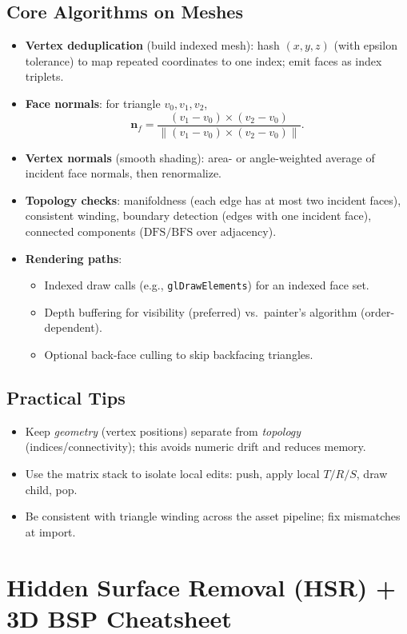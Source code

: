 \documentclass[10pt,twocolumn]{extarticle}
\begin{document}
\subsection*{Core Algorithms on Meshes}
\begin{itemize}
  \item \textbf{Vertex deduplication} (build indexed mesh): hash \((x,y,z)\) (with epsilon tolerance) to map repeated coordinates to one index; emit faces as index triplets.
  \item \textbf{Face normals}: for triangle \(v_0,v_1,v_2\),
  \[
    \mathbf n_f = \frac{(v_1 - v_0) \times (v_2 - v_0)}{\|(v_1 - v_0) \times (v_2 - v_0)\|}.
  \]
  \item \textbf{Vertex normals} (smooth shading): area- or angle-weighted average of incident face normals, then renormalize.
  \item \textbf{Topology checks}: manifoldness (each edge has at most two incident faces), consistent winding, boundary detection (edges with one incident face), connected components (\( \mathrm{DFS}/\mathrm{BFS} \) over adjacency).
  \item \textbf{Rendering paths}:
    \begin{itemize}
      \item Indexed draw calls (e.g., \verb|glDrawElements|) for an indexed face set.
      \item Depth buffering for visibility (preferred) vs.\ painter’s algorithm (order-dependent).
      \item Optional back-face culling to skip backfacing triangles.
    \end{itemize}
\end{itemize}

\subsection*{Practical Tips}
\begin{itemize}
  \item Keep \emph{geometry} (vertex positions) separate from \emph{topology} (indices/connectivity); this avoids numeric drift and reduces memory.
  \item Use the matrix stack to isolate local edits: push, apply local \(T/R/S\), draw child, pop.
  \item Be consistent with triangle winding across the asset pipeline; fix mismatches at import.
\end{itemize}


\section*{Hidden Surface Removal (HSR) + 3D BSP Cheatsheet}
\end{document}
